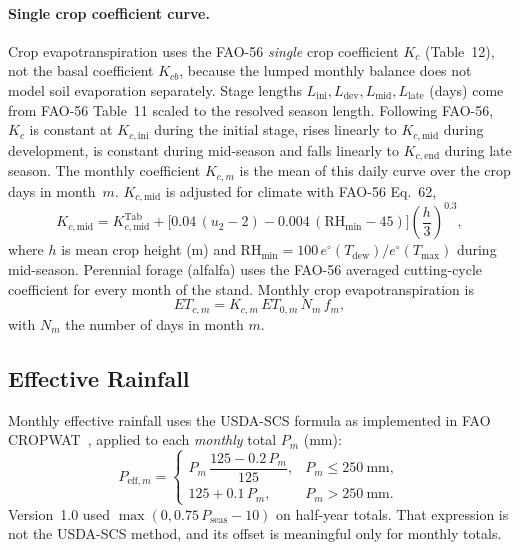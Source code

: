 \paragraph{Single crop coefficient curve.} Crop evapotranspiration uses the FAO-56 \emph{single} crop coefficient $K_c$ (Table~12), not the basal coefficient $K_{cb}$, because the lumped monthly balance does not model soil evaporation separately. Stage lengths $L_{\mathrm{ini}}, L_{\mathrm{dev}}, L_{\mathrm{mid}}, L_{\mathrm{late}}$ (days) come from FAO-56 Table~11 scaled to the resolved season length. Following FAO-56, $K_c$ is constant at $K_{c,\mathrm{ini}}$ during the initial stage, rises linearly to $K_{c,\mathrm{mid}}$ during development, is constant during mid-season and falls linearly to $K_{c,\mathrm{end}}$ during late season. The monthly coefficient $K_{c,m}$ is the mean of this daily curve over the crop days in month~$m$. $K_{c,\mathrm{mid}}$ is adjusted for climate with FAO-56 Eq.~62,
\begin{equation}
  K_{c,\mathrm{mid}} = K_{c,\mathrm{mid}}^{\mathrm{Tab}} + \bigl[0.04\,(u_2 - 2) - 0.004\,(\mathrm{RH}_{\min} - 45)\bigr]\left(\frac{h}{3}\right)^{0.3},
\end{equation}
where $h$ is mean crop height (m) and $\mathrm{RH}_{\min} = 100\, e^{\circ}(T_{\mathrm{dew}})/e^{\circ}(T_{\max})$ during mid-season. Perennial forage (alfalfa) uses the FAO-56 averaged cutting-cycle coefficient for every month of the stand. Monthly crop evapotranspiration is
\begin{equation}
  ET_{c,m} = K_{c,m}\, ET_{0,m}\, N_m\, f_m ,
\end{equation}
with $N_m$ the number of days in month $m$.

\subsection{Effective Rainfall}
Monthly effective rainfall uses the USDA-SCS formula as implemented in FAO CROPWAT~\cite{smith1992cropwat}, applied to each \emph{monthly} total $P_m$ (mm):
\begin{equation}
  P_{\mathrm{eff},m} =
  \begin{cases}
    P_m\,\dfrac{125 - 0.2\,P_m}{125}, & P_m \le 250~\mathrm{mm}, \\[6pt]
    125 + 0.1\,P_m, & P_m > 250~\mathrm{mm}.
  \end{cases}
\end{equation}
Version~1.0 used $\max(0, 0.75\,P_{\mathrm{seas}} - 10)$ on half-year totals. That expression is not the USDA-SCS method, and its offset is meaningful only for monthly totals.

